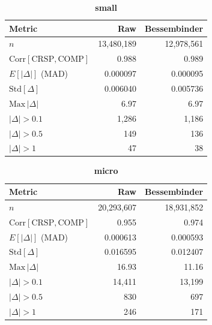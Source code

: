 \documentclass[11pt]{article}
\newcommand{\cmphead}{%
  \toprule
  Metric & Raw & Bessembinder \\
  \midrule
}
\begin{document}
\begin{table}[h]
\centering
\caption*{\textbf{small}}
\begin{tabular}{lrr}
\cmphead
$n$                                          & 13{,}480{,}189 & 12{,}978{,}561 \\
$\mathrm{Corr}[\mathrm{CRSP}, \mathrm{COMP}]$& 0.988 & 0.989 \\
$E[|\Delta|]$ (MAD)                          & 0.000097 & 0.000095 \\
$\mathrm{Std}[\Delta]$                       & 0.006040 & 0.005736 \\
$\mathrm{Max}\,|\Delta|$                     & 6.97 & 6.97 \\
$|\Delta|>0.1$                               & 1{,}286 & 1{,}186 \\
$|\Delta|>0.5$                               & 149 & 136 \\
$|\Delta|>1$                                 & 47 & 38 \\
\bottomrule
\end{tabular}
\end{table}

\begin{table}[h]
\centering
\caption*{\textbf{micro}}
\begin{tabular}{lrr}
\cmphead
$n$                                          & 20{,}293{,}607 & 18{,}931{,}852 \\
$\mathrm{Corr}[\mathrm{CRSP}, \mathrm{COMP}]$& 0.955 & 0.974 \\
$E[|\Delta|]$ (MAD)                          & 0.000613 & 0.000593 \\
$\mathrm{Std}[\Delta]$                       & 0.016595 & 0.012407 \\
$\mathrm{Max}\,|\Delta|$                     & 16.93 & 11.16 \\
$|\Delta|>0.1$                               & 14{,}411 & 13{,}199 \\
$|\Delta|>0.5$                               & 830 & 697 \\
$|\Delta|>1$                                 & 246 & 171 \\
\bottomrule
\end{tabular}
\end{table}
\end{document}
